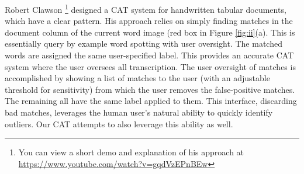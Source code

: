 \documentclass[ms,electronic,twosidetoc,letterpaper,chaptercenter,parttop,lof,lot]{byumsphd}
\begin{document}
Robert Clawson \cite{Clawson2014}\footnote{You can view a short demo and explanation of his approach at \url{https://www.youtube.com/watch?v=gqdVzEPnBEw}} designed a CAT system for handwritten tabular documents, which have a clear pattern. His approach relies on simply finding matches in the document column of the current word image (red box in Figure \ref{fig:ii}(a). This is essentially query by example word spotting with user oversight. The matched words are assigned the same user-specified label. This provides an accurate CAT system where the user oversees all transcription. The user oversight of matches is accomplished by showing a list of matches to the user (with an adjustable threshold for sensitivity) from which the user removes the false-positive matches. The remaining all have the same label applied to them. This interface, discarding bad matches, leverages the human user's natural ability to quickly identify outliers.
Our CAT attempts to also leverage this ability as well.
\end{document}
